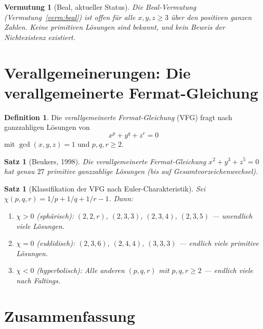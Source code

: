 \documentclass[12pt,a4paper]{amsart}
\newtheorem{satz}[theorem]{Satz}
\newtheorem{vermutung}[theorem]{Vermutung}
\theoremstyle{definition}
\newtheorem{definition_de}[theorem]{Definition}
\theoremstyle{remark}
\begin{document}
\begin{vermutung}[Beal, aktueller Status]\label{verm:beal_status}
Die Beal-Vermutung (Vermutung~\ref{verm:beal}) ist offen für alle $x, y, z \geq 3$
über den positiven ganzen Zahlen. Keine primitiven Lösungen sind bekannt, und kein
Beweis der Nichtexistenz existiert.
\end{vermutung}

\section{Verallgemeinerungen: Die verallgemeinerte Fermat-Gleichung}

\begin{definition_de}
Die \emph{verallgemeinerte Fermat-Gleichung} (VFG) fragt nach ganzzahligen Lösungen von
\[
  x^p + y^q + z^r = 0
\]
mit $\gcd(x,y,z) = 1$ und $p, q, r \geq 2$.
\end{definition_de}

\begin{satz}[Beukers, 1998]\label{satz:beukers}
Die verallgemeinerte Fermat-Gleichung $x^2 + y^3 + z^5 = 0$ hat genau $27$
primitive ganzzahlige Lösungen (bis auf Gesamtvorzeichenwechsel).
\end{satz}

\begin{satz}[Klassifikation der VFG nach Euler-Charakteristik]\label{satz:euler}
Sei $\chi(p,q,r) = 1/p + 1/q + 1/r - 1$. Dann:
\begin{enumerate}[label=(\roman*)]
  \item $\chi > 0$ (sphärisch): $(2,2,r)$, $(2,3,3)$, $(2,3,4)$, $(2,3,5)$ —
        unendlich viele Lösungen.
  \item $\chi = 0$ (euklidisch): $(2,3,6)$, $(2,4,4)$, $(3,3,3)$ —
        endlich viele primitive Lösungen.
  \item $\chi < 0$ (hyperbolisch): Alle anderen $(p,q,r)$ mit $p,q,r \geq 2$ —
        endlich viele nach Faltings.
\end{enumerate}
\end{satz}

\section{Zusammenfassung}
\end{document}
